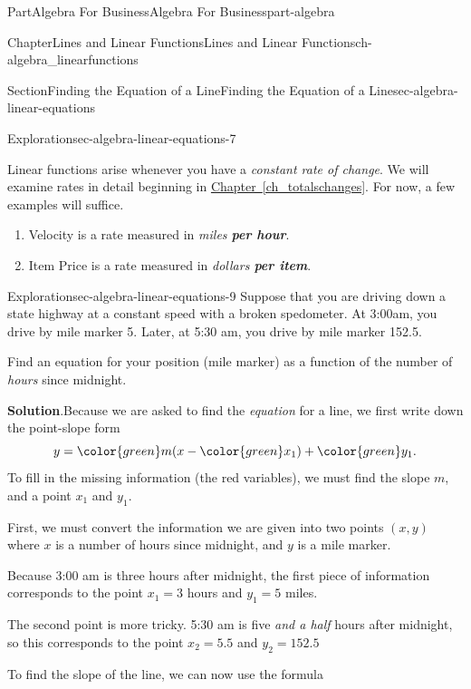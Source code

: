 \documentclass{tufte-book}
\newcommand{\blocktitlefont}{\relax}
\newcommand{\xreffont}{\relax}
\newcommand{\alert}[1]{\textbf{\textit{#1}}}
\numberwithin{equation}{chapter}
\begin{document}
\begin{partptx}{Part}{Algebra For Business}{}{Algebra For Business}{}{}{part-algebra}
\begin{chapterptx}{Chapter}{Lines and Linear Functions}{}{Lines and Linear Functions}{}{}{ch-algebra_linearfunctions}
\begin{sectionptx}{Section}{Finding the Equation of a Line}{}{Finding the Equation of a Line}{}{}{sec-algebra-linear-equations}
\begin{exploration}{Exploration}{}{sec-algebra-linear-equations-7}
\begin{image}{0.25}{0.5}{0.25}{}
{
}%
\end{image}%
\end{exploration}%
Linear functions arise whenever you have a \emph{constant rate of change}. We will examine rates in detail beginning in \hyperref[ch_totalschanges]{Chapter~{\xreffont\ref{ch_totalschanges}}}. For now, a few examples will suffice.%
\begin{enumerate}
\item{}Velocity is a rate measured in \emph{miles \alert{per hour}}.%
\item{}Item Price is a rate measured in \emph{dollars \alert{per item}}.%
\end{enumerate}
%
\begin{exploration}{Exploration}{}{sec-algebra-linear-equations-9}%
Suppose that you are driving down a state highway at a constant speed with a broken spedometer. At 3:00am, you drive by mile marker 5. Later, at 5:30 am, you drive by mile marker 152.5.%
\par
Find an equation for your position (mile marker) as a function of the number of \emph{hours} since midnight.%
\par\smallskip%
\noindent\textbf{\blocktitlefont Solution}.\hypertarget{sec-algebra-linear-equations-9-2}{}\quad{}Because we are asked to find the \emph{equation} for a line, we first write down the point-slope form%
\begin{equation*}
y = {\color{green} m} (x - { \color{green} x_1}) + {\color{green} y_1} \text{.}
\end{equation*}
To fill in the missing information (the red variables), we must find the slope \(m\), and a point \(x_1\) and \(y_1\).%
\par
First, we must convert the information we are given into two points \((x,y)\) where \(x\) is a number of hours since midnight, and \(y\) is a mile marker.%
\par
Because 3:00 am is three hours after midnight, the first piece of information corresponds to the point \(x_1 = 3\) hours and \(y_1=5\) miles.%
\par
The second point is more tricky.  5:30 am is five \emph{and a half} hours after midnight, so this corresponds to the point \(x_2=5.5\) and \(y_2 = 152.5\)%
\par
To find the slope of the line, we can now use the formula%

\end{exploration}
\end{sectionptx}
\end{chapterptx}
\end{partptx}
\end{document}
